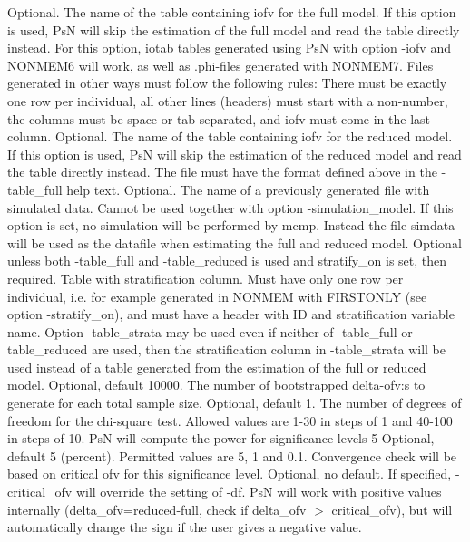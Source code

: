 \begin{optionlist}
\nextopt
{}
Optional. The name of the table containing iofv for the full model. If this option is used, PsN will skip the estimation of the full model and read the table directly instead. For this option, iotab tables generated using PsN with option -iofv and NONMEM6 will work, as well as .phi-files generated with NONMEM7. Files generated in other ways must follow the following rules: There must be exactly one row per individual, all other lines (headers) must start with a non-number, the columns must be space or tab separated, and iofv must come in the last column. 
\nextopt
{}
Optional. The name of the table containing iofv for the reduced model. If this option is used, PsN will skip the estimation of the reduced model and read the table directly instead. The file must have the format defined above in the -table\_full help text. 
\nextopt
{}
Optional. The name of a previously generated file with simulated data. Cannot be used together with option -simulation\_model. If this option is set, no simulation will be performed by mcmp. Instead the file simdata will be used as the datafile when estimating the full and reduced model. 
\nextopt
{}
Optional unless both -table\_full and -table\_reduced is used and stratify\_on is set, then required. Table with stratification column. Must have only one row per individual, i.e. for example generated in NONMEM with FIRSTONLY (see option -stratify\_on), and must have a header with ID and stratification variable name. Option -table\_strata may be used even if neither of -table\_full or -table\_reduced are used, then the stratification column in -table\_strata will be used instead of a table generated from the estimation of the full or reduced model. 
\nextopt
{}
Optional, default 10000. The number of bootstrapped delta-ofv:s to generate for each total sample size. 
\nextopt
{}
Optional, default 1. The number of degrees of freedom for the chi-square test. Allowed values are 1-30 in steps of 1 and 40-100 in steps of 10. PsN will compute the power for significance levels 5%
\nextopt
{}
Optional, default 5 (percent). Permitted values are 5, 1 and 0.1. Convergence check will be based on critical ofv for this significance level. 
\nextopt
{}
Optional, no default. If specified, -critical\_ofv will override the setting of -df. PsN will work with positive values internally (delta\_ofv=reduced-full, check if delta\_ofv $>$ critical\_ofv), but will automatically change the sign if the user gives a negative value. 
\nextopt
\end{optionlist}

